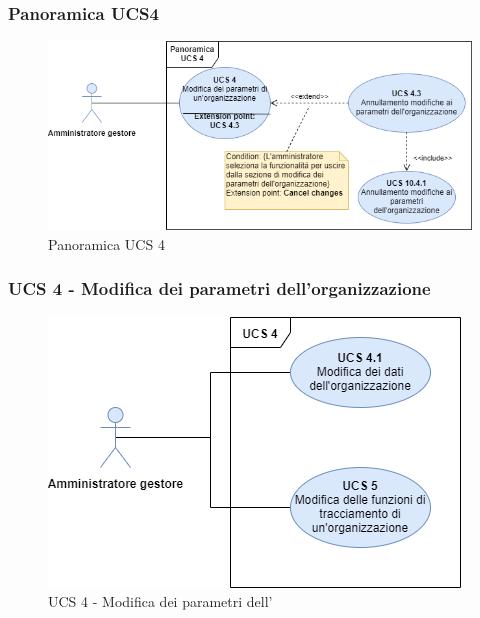 \subsubsection{Panoramica UCS4}

\begin{figure}[h]
	\centering	
	\includegraphics[scale=0.53]{Sezioni/UseCase/Immagini/PanoramicaUCS4.png}
	\caption{Panoramica UCS 4}
\end{figure}

\subsubsection{UCS 4 - Modifica dei parametri dell'organizzazione}%

\begin{figure}[h]
	\centering	
	\includegraphics[scale=0.53]{Sezioni/UseCase/Immagini/UCS4.png}
	\caption{UCS 4 - Modifica dei parametri dell'}
\end{figure}

